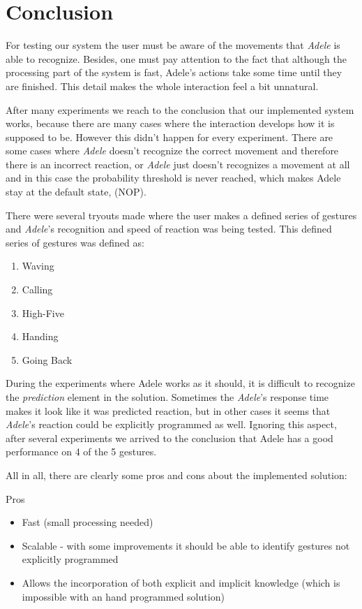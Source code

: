 \section{Conclusion}
For testing our system the user must be aware of the movements that \textit{Adele} is able to recognize. Besides, one must pay attention to the fact that although the processing part of the system is fast, Adele's actions take some time until they are finished. This detail makes the whole interaction feel a bit unnatural.

After many experiments we reach to the conclusion that our implemented system works, because there are many cases where the interaction develops how it is supposed to be. However this didn't happen for every experiment. There are some cases where \textit{Adele} doesn't recognize the correct movement and therefore there is an incorrect reaction, or \textit{Adele} just doesn't recognizes a movement at all and in this case the probability threshold is never reached, which makes Adele stay at the default state, (NOP).

There were several tryouts made where the user makes a defined series of gestures and \textit{Adele}'s recognition and speed of reaction was being tested. This defined series of gestures was defined as:
\begin{enumerate}
\item Waving
\item Calling
\item High-Five
\item Handing
\item Going Back
\end{enumerate}

During the experiments where Adele works as it should, it is difficult to recognize the \textit{prediction} element in the solution. Sometimes the \textit{Adele}'s response time makes it look like it was predicted reaction, but in other cases it seems that \textit{Adele}'s reaction could be explicitly programmed as well. Ignoring this aspect, after several experiments we arrived to the conclusion that Adele has a good performance on 4 of the 5 gestures.

All in all, there are clearly some pros and cons about the implemented solution:

\centerline{Pros}
\begin{itemize}
\item Fast (small processing needed)
\item Scalable - with some improvements it should be able to identify gestures not explicitly programmed
\item Allows the incorporation of both explicit and implicit knowledge (which is impossible with an hand programmed solution)
\end{itemize}

